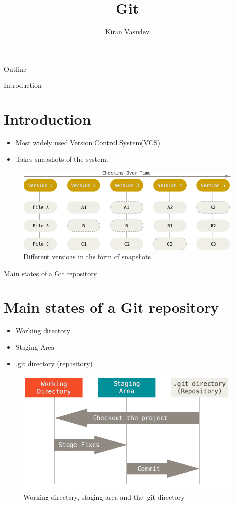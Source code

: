 \documentclass{beamer}
\title{Git}
\author{Kiran Vasudev\inst{1}}
\institute[] 
{
  \inst{1}
  Hochschule Bonn-Rhein-Sieg

}
\begin{document}
\begin{frame}
  \titlepage
\end{frame}

\begin{frame}{Outline}
  \tableofcontents
\end{frame}

\begin{frame}{Introduction}
\section{Introduction}
  \begin{itemize}
  \item {
    Most widely used Version Control System(VCS)
  }
  \item {
    Takes snapshots of the system.
  }
  \end{itemize}
\begin{figure}
	\includegraphics[scale=0.3]{images/git}
	\caption{Different versions in the form of snapshots\cite{git-basics}}
\end{figure}
\end{frame}

\begin{frame}{Main states of a Git repository}
\section{Main states of a Git repository}
  \begin{itemize}
  \item {
    Working directory
  }
  \item {   
    Staging Area
  }
  \item {   
    .git directory (repository)
  }
  \end{itemize}
	\begin{figure}
		\includegraphics[scale=0.3]{images/areas}
		\caption{Working directory, staging area and the .git directory\cite{git-basics}}
	\end{figure}
\end{frame}
\end{document}
